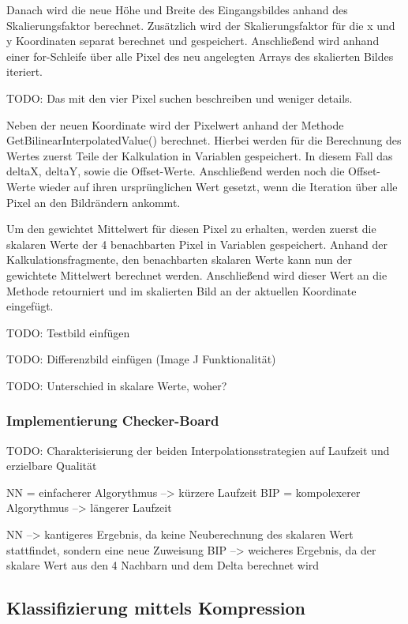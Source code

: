 \documentclass[12pt,german]{article}
\begin{document}
Danach wird die neue Höhe und Breite des Eingangsbildes anhand des Skalierungsfaktor berechnet. Zusätzlich wird der Skalierungsfaktor für die x und y Koordinaten separat berechnet und gespeichert. Anschließend wird anhand einer for-Schleife über alle Pixel des neu angelegten Arrays des skalierten Bildes iteriert. 

TODO: Das mit den vier Pixel suchen beschreiben und weniger details.

Neben der neuen Koordinate wird der Pixelwert anhand der Methode GetBilinearInterpolatedValue() berechnet. Hierbei werden für die Berechnung des Wertes zuerst Teile der Kalkulation in Variablen gespeichert. In diesem Fall das deltaX, deltaY, sowie die Offset-Werte. Anschließend werden noch die Offset-Werte wieder auf ihren ursprünglichen Wert gesetzt, wenn die Iteration über alle Pixel an den Bildrändern ankommt. 


Um den gewichtet Mittelwert für diesen Pixel zu erhalten, werden zuerst die skalaren Werte der 4 benachbarten Pixel in Variablen gespeichert. Anhand der Kalkulationsfragmente, den benachbarten skalaren Werte kann nun der gewichtete Mittelwert berechnet werden. Anschließend wird dieser Wert an die Methode retourniert und im skalierten Bild an der aktuellen Koordinate eingefügt.

TODO: Testbild einfügen

TODO: Differenzbild einfügen (Image J Funktionalität)

TODO: Unterschied in skalare Werte, woher? \\




\subsubsection{Implementierung Checker-Board}
TODO: Charakterisierung der beiden Interpolationsstrategien auf Laufzeit und erzielbare Qualität

 NN = einfacherer Algorythmus --> kürzere Laufzeit
BIP = kompolexerer Algorythmus --> längerer Laufzeit

NN --> kantigeres Ergebnis, da keine Neuberechnung des skalaren Wert stattfindet, sondern eine neue Zuweisung
BIP --> weicheres Ergebnis, da der skalare Wert aus den 4 Nachbarn und dem Delta berechnet wird


\subsection{Klassifizierung mittels Kompression}
\end{document}
